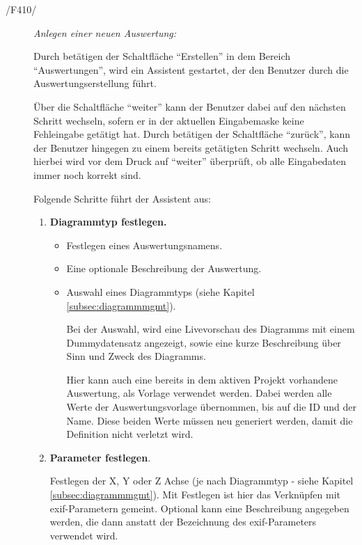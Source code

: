 	\begin{description}
		
		\item[/F410/] \textit{Anlegen einer neuen Auswertung:}\par Durch betätigen der Schaltfläche "`Erstellen"' in dem Bereich "`Auswertungen"', wird ein Assistent gestartet, der den Benutzer durch die Auswertungserstellung führt.\par Über die Schaltfläche "`weiter"' kann der Benutzer dabei auf den nächsten Schritt wechseln, sofern er in der aktuellen Eingabemaske keine Fehleingabe getätigt hat. Durch betätigen der Schaltfläche "`zurück"', kann der Benutzer hingegen zu einem bereits getätigten Schritt wechseln. Auch hierbei wird vor dem Druck auf "`weiter"' überprüft, ob alle Eingabedaten immer noch korrekt sind.\par Folgende Schritte führt der Assistent aus:

			\begin{enumerate}

				\item \textbf{Diagrammtyp festlegen.}

					\begin{itemize}

						\item Festlegen eines Auswertungsnamens.

						\item Eine optionale Beschreibung der Auswertung.

						\item Auswahl eines Diagrammtyps (siehe Kapitel \ref{subsec:diagrammmgmt}).\par Bei der Auswahl, wird eine Livevorschau des Diagramms mit einem Dummydatensatz angezeigt, sowie eine kurze Beschreibung über Sinn und Zweck des Diagramms.\par Hier kann auch eine bereits in dem aktiven Projekt vorhandene Auswertung, als Vorlage verwendet werden. Dabei werden alle Werte der Auswertungsvorlage übernommen, bis auf die ID und der Name. Diese beiden Werte müssen neu generiert werden, damit die Definition nicht verletzt wird.

					\end{itemize}

				\item \textbf{Parameter festlegen}.\par Festlegen der X, Y oder Z Achse (je nach Diagrammtyp - siehe Kapitel \ref{subsec:diagrammmgmt}). Mit Festlegen ist hier das Verknüpfen mit \gls{exif}-Parametern gemeint. Optional kann eine Beschreibung angegeben werden, die dann anstatt der Bezeichnung des \gls{exif}-Parameters verwendet wird.


\end{enumerate}
\end{description}
